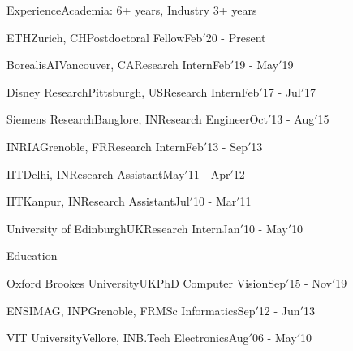 \documentclass{resume} %
\begin{document}

\begin{paracol}{2}
\setlength{\columnsep}{2em}
\begin{rSection}{Experience}{\quad Academia: 6+ years, Industry 3+ years}
\begin{rSubsection}{ETH}{Zurich, CH}{Postdoctoral Fellow}{Feb$'$20 - Present}\end{rSubsection}
\begin{rSubsection}{BorealisAI}{Vancouver, CA}{Research Intern}{Feb$'$19 - May$'$19}\end{rSubsection}
\begin{rSubsection}{Disney Research}{Pittsburgh, US}{Research Intern}{Feb$'$17 - Jul$'$17}\end{rSubsection}
\begin{rSubsection}{Siemens Research}{Banglore, IN}{Research Engineer}{Oct$'$13 - Aug$'$15}\end{rSubsection}
\begin{rSubsection}{INRIA}{Grenoble, FR}{Research Intern}{Feb$'$13 - Sep$'$13}\end{rSubsection}
\begin{rSubsection}{IIT}{Delhi, IN}{Research Assistant}{May$'$11 - Apr$'$12}\end{rSubsection}
\begin{rSubsection}{IIT}{Kanpur, IN}{Research Assistant}{Jul$'$10 - Mar$'$11}\end{rSubsection}
\begin{rSubsection}{University of Edinburgh}{UK}{Research Intern}{Jan$'$10 - May$'$10}\end{rSubsection}
\end{rSection}

\begin{rSection}{Education}{}
\begin{eSubsection}{Oxford Brookes University}{UK}{PhD Computer Vision}{Sep$'$15 - Nov$'$19}\end{eSubsection}
\begin{eSubsection}{ENSIMAG, INP}{Grenoble, FR}{MSc Informatics}{Sep$'$12 - Jun$'$13}\end{eSubsection}
\begin{eSubsection}{VIT University}{Vellore, IN}{B.Tech Electronics}{Aug$'$06 - May$'$10}\end{eSubsection} 
\end{rSection}



\end{paracol}
\end{document}
